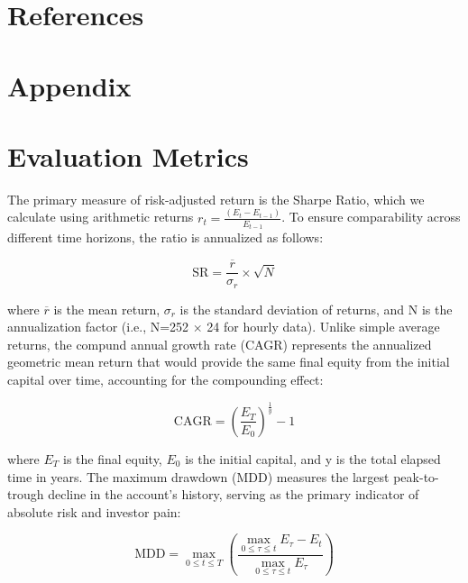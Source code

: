 \documentclass[12pt, a4paper]{article}
\begin{document}
\section{References}
\printbibliography[heading=none]

\section{Appendix}
\appendix


\section{Evaluation Metrics}\label{app:metrics}

The primary measure of risk-adjusted return is the Sharpe Ratio, which we calculate using arithmetic returns \( r_t = \frac{(E_t - E_{t-1})}{E_{t-1}} \). 
To ensure comparability across different time horizons, the ratio is annualized as follows:

\begin{equation}
    \text{SR} = \frac{\overline{r}}{\sigma_{r}} \times \sqrt{N}
    \label{eq:sharpe_ratio}
\end{equation}

where $\overline{r}$ is the mean return, $\sigma_{r}$ is the standard deviation of returns, and N is the annualization factor (i.e., N=252 $\times$ 24 for hourly data).
Unlike simple average returns, the compund annual growth rate (CAGR) represents the annualized geometric mean return that would provide the same final equity from the initial capital over time, 
accounting for the compounding effect:

\begin{equation}
    \text{CAGR} = \left( \frac{E_T}{E_0} \right)^{\frac{1}{y}} - 1
    \label{eq:cagr}
\end{equation}

where $E_T$ is the final equity, $E_0$ is the initial capital, and y is the total elapsed time in years.
The maximum drawdown (MDD) measures the largest peak-to-trough decline in the account's history, serving as the primary indicator of absolute risk and investor pain:

\begin{equation}
    \text{MDD} = \max_{0 \leq t \leq T} \left( \frac{ \max_{0 \leq \tau \leq t} E_\tau - E_t }{ \max_{0 \leq \tau \leq t} E_\tau } \right)
    \label{eq:mdd}
\end{equation}
\end{document}

